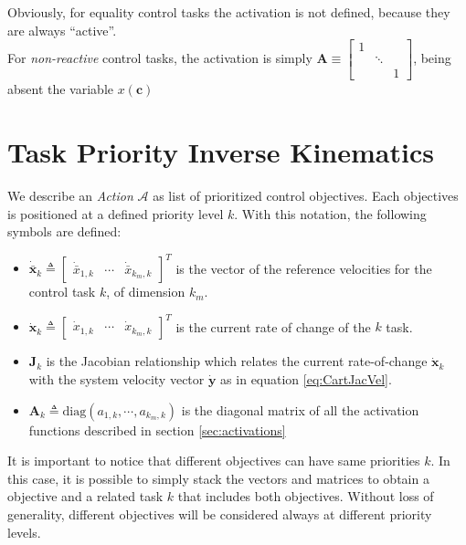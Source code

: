 Obviously, for equality control tasks the activation is not defined, because they are always \enquote{active}.\\
For \textit{non-reactive} control tasks, the activation is simply $\boldsymbol{A} \equiv 	\begin{bmatrix}
1 & & \\
& \ddots & \\
& & 1	 
\end{bmatrix}$, being absent the variable $x(\boldsymbol{c})$


\section{Task Priority Inverse Kinematics}
\label{sec:tpik}
We describe an \textit{Action} $\mathcal{A}$ as list of prioritized control objectives. Each objectives is positioned at a defined priority level $k$. With this notation, the following symbols are defined:
\begin{itemize}
	\item $\dot{\bar{\boldsymbol{x}}}_k \triangleq \begin{bmatrix}\dot{\bar{x}}_{1,k} & \cdots & \dot{\bar{x}}_{k_m,k}\end{bmatrix}^T$ is the vector of the reference velocities for the control task $k$, of dimension $k_m$.
	\item $\dot{\boldsymbol{x}}_k \triangleq \begin{bmatrix}\dot{x}_{1,k} & \cdots & \dot{x}_{k_m,k}\end{bmatrix}^T$ is the current rate of change of the $k$ task.
	\item $\boldsymbol{J}_k$ is the Jacobian relationship which relates the current rate-of-change $\dot{\boldsymbol{x}}_k$ with the system velocity vector $\dot{\boldsymbol{y}}$ as in equation \eqref{eq:CartJacVel}.
	\item $\boldsymbol{A}_k \triangleq \textrm{diag}(a_{1,k},  \cdots,  a_{k_m,k})$ is the diagonal matrix of all the activation functions described in section \ref{sec:activations}
\end{itemize}
It is important to notice that different objectives can have same priorities $k$. In this case, it is possible to simply stack the vectors and matrices to obtain a objective and a related task $k$ that includes both objectives. Without loss of generality, different objectives will be considered always at different priority levels.

